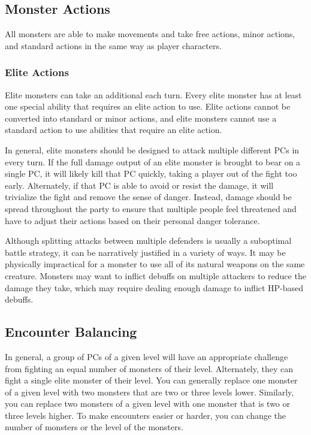   \subsection{Monster Actions}\label{Monster Actions}
    All monsters are able to make movements and take free actions, minor actions, and standard actions in the same way as player characters.

    \subsubsection{Elite Actions}\label{Elite Actions}
      Elite monsters can take an additional  each turn.
      Every elite monster has at least one special ability that requires an elite action to use.
      Elite actions cannot be converted into standard or minor actions, and elite monsters cannot use a standard action to use abilities that require an elite action.

      In general, elite monsters should be designed to attack multiple different PCs in every turn.
      If the full damage output of an elite monster is brought to bear on a single PC, it will likely kill that PC quickly, taking a player out of the fight too early.
      Alternately, if that PC is able to avoid or resist the damage, it will trivialize the fight and remove the sense of danger.
      Instead, damage should be spread throughout the party to ensure that multiple people feel threatened and have to adjust their actions based on their personal danger tolerance.

      Although splitting attacks between multiple defenders is usually a suboptimal battle strategy, it can be narratively justified in a variety of ways.
      It may be physically impractical for a monster to use all of its natural weapons on the same creature.
      Monsters may want to inflict debuffs on multiple attackers to reduce the damage they take, which may require dealing enough damage to inflict HP-based debuffs.

  \subsection{Encounter Balancing}\label{Encounter Balancing}
    In general, a group of PCs of a given level will have an appropriate challenge from fighting an equal number of monsters of their level.
    Alternately, they can fight a single elite monster of their level.
    You can generally replace one monster of a given level with two monsters that are two or three levels lower.
    Similarly, you can replace two monsters of a given level with one monster that is two or three levels higher.
    To make encounters easier or harder, you can change the number of monsters or the level of the monsters.

